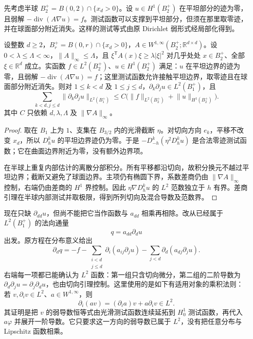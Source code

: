 先考虑半球 \(B_2^+=B(0,2)\cap\{x_d>0\}\)。设 \(u\in H^1(B_2^+)\) 在平坦部分的迹为零，且弱解 \(-\operatorname{div}(A\nabla u)=f\)。测试函数可以支撑到平坦部分，但须在那里取零迹，并在球面部分附近消失。这样的测试等式由原 Dirichlet 弱形式经局部化得到。

\begin{lemma}[边界切向估计]
\label{b2:lem:16-tangential-estimate}
设整数 \(d\geq2\)，\(B_r^+=B(0,r)\cap\{x_d>0\}\)，\(A\in W^{1,\infty}(B_2^+;\mathbb R^{d\times d})\)。设 \(0<\lambda\leq\Lambda<\infty\)，\(\|A\|_\infty\leq\Lambda\)，且 \(\xi^{\mathsf T}A(x)\xi\geq\lambda|\xi|^2\) 对几乎处处 \(x\in B_2^+\)、全部 \(\xi\in\mathbb R^d\) 成立。实函数 \(f\in L^2(B_2^+)\)、\(u\in H^1(B_2^+)\) 满足：\(u\) 在平坦边界的迹为零，且弱解 \(-\operatorname{div}(A\nabla u)=f\)；这里测试函数允许接触平坦边界，取零迹且在球面部分附近消失。则对 \(1\leq k<d\) 及 \(1\leq j\leq d\)，\(\partial_k\partial_j u\in L^2(B_1^+)\)，且
\[\sum_{k<d,j\le d}\lVert\partial_k\partial_j u\rVert_{L^2(B_1^+)}
 \le C\bigl(\lVert f\rVert_{L^2(B_2^+)}+\lVert u\rVert_{H^1(B_2^+)}\bigr).\]
其中 \(C\) 只依赖 \(d,\lambda,\Lambda\) 及 \(\|\nabla A\|_\infty\)。
\end{lemma}
\begin{proof}
取在 \(B_1\) 上为 \(1\)、支集在 \(B_{3/2}\) 内的光滑截断 \(\eta\)。对切向方向 \(e_k\)，平移不改变 \(x_d\)，所以 \(D_h^ku\) 的平坦边界迹仍为零。于是 \(-D_{-h}^k(\eta^2D_h^ku)\) 是合法零迹测试函数；它在曲面边界附近为零，没有额外边界项。

在半球上重复内部估计的离散分部积分。所有平移都沿切向，故积分换元不越过平坦边界；截断又避免了球面边界。主项仍有椭圆下界，系数差商仍由 \(\lVert\nabla A\rVert_\infty\) 控制，右端仍由差商的 \(H^1\) 界控制。因此 \(\eta\nabla D_h^ku\) 的 \(L^2\) 范数独立于 \(h\) 有界。差商引理在半球内部测试并取极限，得到所列切向及混合导数及范数界。
\end{proof}

现在只缺 \(\partial_{dd}u\)，但尚不能把它当作函数与 \(a_{dd}\) 相乘再相除。改从已经属于 \(L^2(B_1^+)\) 的法向通量
\[q=a_{dd}\partial_du\]
出发。原方程在分布意义给出
\[
 \partial_dq=-f
 -\sum_{\substack{i<d\\j\leq d}}\partial_i(a_{ij}\partial_ju)
 -\sum_{j<d}\partial_d(a_{dj}\partial_ju).
\]
右端每一项都已能确认为 \(L^2\) 函数：第一组只含切向微分，第二组的二阶导数为 \(\partial_d\partial_ju=\partial_j\partial_du\)，也由切向引理控制。这里使用的是如下有适用对象的乘积法则：若 \(v,\partial_iv\in L^2\)、\(a\in W^{1,\infty}\)，则
\[\partial_i(av)=(\partial_i a)v+a\partial_iv\in L^2.\]
其证明是把 \(v\) 的弱导数恒等式由光滑测试函数连续延拓到 \(H_0^1\) 测试函数，再代入 \(a\varphi\) 并展开一阶导数。它只要求这一方向的弱导数已属于 \(L^2\)，没有把任意分布与 Lipschitz 函数相乘。

